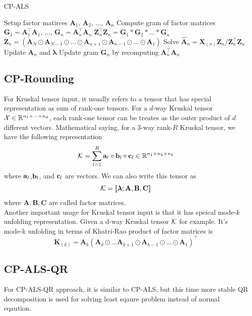 \documentclass{article}
\newcommand{\mat}[1]{\mathbf{#1}}
\newcommand{\M}[2][]{\bm{#1{\mathbf{\MakeUppercase{#2}}}}} 		%
\newcommand{\V}[2][]{\bm{#1{\mathbf{\MakeLowercase{#2}}}}} 		%
\newcommand{\T}[2][]{#1{\mathbf{\cal{#2}}}} 						%
\begin{document}
\begin{algorithm}[!ht]
  \caption{CP-ALS}
  \label{alg:cp-als}
  \begin{algorithmic}[1]\footnotesize
    
    \Function{$[\bm{\lambda},\M{A}_{n}]=$ CP-ALS}{$\T{X},R$}
      \State Setup factor matirces  $\mat{A}_1$, $\mat{A}_2$, $\dots$, $\mat{A}_n$
      \State Compute gram of factor matrices $\mat{G}_1 = \mat{A}_1^\top \mat{A}_1$, $\dots$, $\mat{G}_n = \mat{A}_n^\top \mat{A}_n$  
      \State $\mat{Z}_n^\top\mat{Z}_n = \mat{G}_1 \ast \mat{G}_2 \ast \dots \ast \mat{G}_n$
      \State $\mat{Z}_n =  (\mat{A}_N \odot \mat{A}_{N-1} \odot \dots \odot \mat{A}_{n+1} \odot \mat{A}_{n-1} \odot \dots \odot \mat{A}_1)$
      \State Solve $\mat{\hat{A}}_n = \mat{X}_{(n)}\mat{Z}_n / \mat{Z}_n^\top\mat{Z}_n$
      \State Update $\mat{A}_n$ and $\bm{\lambda}$
      \State Update gram $\mat{G}_n$ by recomputing $\mat{A}_n^\top\mat{A}_n$
      
      \EndFor
      \EndWhile
    \EndFunction
    
  \end{algorithmic}
\end{algorithm}

\subsection*{CP-Rounding}
For Kruskal tensor input, it usually refers to a tensor that has special representation as sum of rank-one 
tensors. For a $d$-way Kruskal tensor $\T{X} \in \mathbb{R}^{n_1 \times \dots \times n_d}$, each rank-one 
tensor can be treates as the outer product of $d$ different vectors. Mathematical saying, for a 3-way rank-$R$ Kruskal tensor,
we have the following representation
$$\T{K} = \sum^{R}_{l=1}\V{a}_l \circ\V{b}_l \circ\V{c}_l \in \mathbb{R}^{n_1 \times n_2 \times n_3}$$
where $\V{a}_l$,$\V{b}_l$, and $ \V{c}_l$ are vectors. We can also write this tensor as
$$\T{K} = [\![\bm{\lambda} ; \mat{A},\mat{B},\mat{C}]\!]$$
where $\mat{A},\mat{B},\mat{C}$ are called factor matrices.
\\
Another important usage for Kruskal tensor input is that it has speical mode-$k$ unfolding representation. Given a d-way Kruskal tensor $\T{K}$ for example. It's mode-k unfolding 
in terms of Khatri-Rao product of factor matrices is
$$\mat{K}_{(k)} = \mat{A}_k(\mat{A}_d \odot \dots \mat{A}_{k+1} \odot \mat{A}_{k-1} \odot \dots \odot \mat{A}_1)^\top$$
\subsection*{CP-ALS-QR}
For CP-ALS-QR approach, it is similar to CP-ALS, but this time more stable QR decomposition is used for solving least sqaure
problem instead of normal eqaution.
\end{document}
